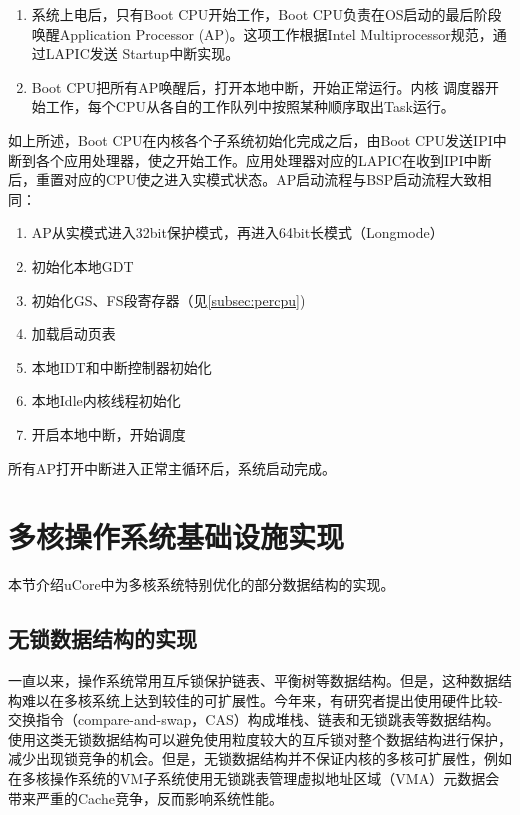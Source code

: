 	\begin{enumerate}
		\item 系统上电后，只有Boot CPU开始工作，Boot
	CPU负责在OS启动的最后阶段唤醒Application Processor
	(AP)。这项工作根据Intel Multiprocessor规范，通过LAPIC发送
	Startup中断实现。

		\item Boot CPU把所有AP唤醒后，打开本地中断，开始正常运行。内核
	调度器开始工作，每个CPU从各自的工作队列中按照某种顺序取出Task运行。
	\end{enumerate}


如上所述，Boot CPU在内核各个子系统初始化完成之后，由Boot CPU发送IPI中断到各个应用处理器，使之开始工作。应用处理器对应的LAPIC在收到IPI中断后，重置对应的CPU使之进入实模式状态。AP启动流程与BSP启动流程大致相同：

\begin{enumerate}
\item AP从实模式进入32bit保护模式，再进入64bit长模式（Longmode）
\item 初始化本地GDT
\item 初始化GS、FS段寄存器（见\ref{subsec:percpu})
\item 加载启动页表
\item 本地IDT和中断控制器初始化
\item 本地Idle内核线程初始化
\item 开启本地中断，开始调度
\end{enumerate}

所有AP打开中断进入正常主循环后，系统启动完成。

\section{多核操作系统基础设施实现}
本节介绍uCore中为多核系统特别优化的部分数据结构的实现。

\subsection{无锁数据结构的实现}
一直以来，操作系统常用互斥锁保护链表、平衡树等数据结构。但是，这种数据结构难以在多核系统上达到较佳的可扩展性。今年来，有研究者\cite{Fraser:2007:CPW:1233307.1233309}提出使用硬件比较-交换指令（compare-and-swap，CAS）构成堆栈、链表和无锁跳表等数据结构。使用这类无锁数据结构可以避免使用粒度较大的互斥锁对整个数据结构进行保护，减少出现锁竞争的机会。但是，无锁数据结构并不保证内核的多核可扩展性，例如在多核操作系统的VM子系统使用无锁跳表管理虚拟地址区域（VMA）元数据会带来严重的Cache竞争\cite{radixvm:eurosys13}，反而影响系统性能。

